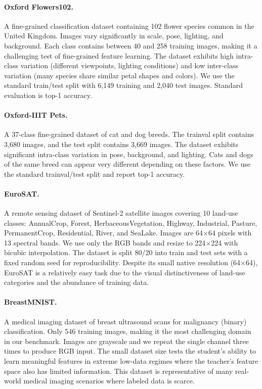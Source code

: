 \documentclass{article}
\begin{document}
\paragraph{Oxford Flowers102.} A fine-grained classification dataset containing 102 flower species common in the United Kingdom. Images vary significantly in scale, pose, lighting, and background. Each class contains between 40 and 258 training images, making it a challenging test of fine-grained feature learning. The dataset exhibits high intra-class variation (different viewpoints, lighting conditions) and low inter-class variation (many species share similar petal shapes and colors). We use the standard train/test split with 6,149 training and 2,040 test images. Standard evaluation is top-1 accuracy.

\paragraph{Oxford-IIIT Pets.} A 37-class fine-grained dataset of cat and dog breeds. The trainval split contains 3,680 images, and the test split contains 3,669 images. The dataset exhibits significant intra-class variation in pose, background, and lighting. Cats and dogs of the same breed can appear very different depending on these factors. We use the standard trainval/test split and report top-1 accuracy.

\paragraph{EuroSAT.} A remote sensing dataset of Sentinel-2 satellite images covering 10 land-use classes: AnnualCrop, Forest, HerbaceousVegetation, Highway, Industrial, Pasture, PermanentCrop, Residential, River, and SeaLake. Images are 64$\times$64 pixels with 13 spectral bands. We use only the RGB bands and resize to 224$\times$224 with bicubic interpolation. The dataset is split 80/20 into train and test sets with a fixed random seed for reproducibility. Despite its small native resolution (64$\times$64), EuroSAT is a relatively easy task due to the visual distinctiveness of land-use categories and the abundance of training data.

\paragraph{BreastMNIST.} A medical imaging dataset of breast ultrasound scans for malignancy (binary) classification. Only 546 training images, making it the most challenging domain in our benchmark. Images are grayscale and we repeat the single channel three times to produce RGB input. The small dataset size tests the student's ability to learn meaningful features in extreme low-data regimes where the teacher's feature space also has limited information. This dataset is representative of many real-world medical imaging scenarios where labeled data is scarce.
\end{document}
